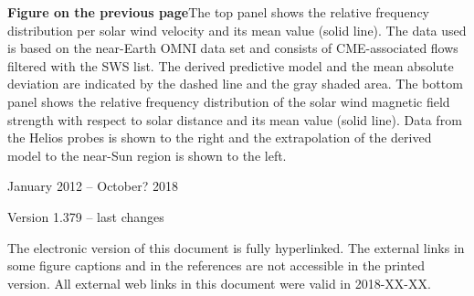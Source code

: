 \newpage

\vspace*{\fill}

\begin{small}
	\noindent \textbf{Figure on the previous page}\quad The top panel shows the relative \Kp{} frequency distribution per solar wind velocity and its mean value (solid line). The data used is based on the near-Earth OMNI data set and consists of CME-associated flows filtered with the SWS list. The derived predictive model and the mean absolute deviation are indicated by the dashed line and the gray shaded area.
	The bottom panel shows the relative frequency distribution of the solar wind magnetic field strength with respect to solar distance and its mean value (solid line). Data from the Helios probes is shown to the right and the extrapolation of the derived model to the near-Sun region is shown to the left.


	\noindent January 2012 -- October? 2018

	
	\vspace{1\baselineskip}

	\noindent Version 1.379 -- last changes \ISOToday{} \thistime{}
	
	\vspace{1\baselineskip}
	
	\noindent The electronic version of this document is fully hyperlinked. The external links in some figure captions and in the references are not accessible in the printed version. All external web links in this document were valid in 2018-XX-XX.
\end{small}


\normalsize

